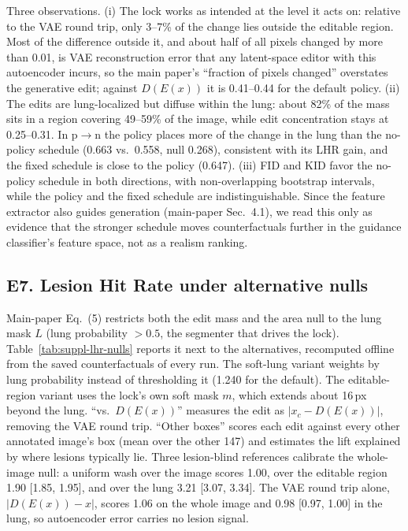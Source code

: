 Three observations. (i) The lock works as intended at the level it acts on: relative to the VAE round trip, only 3--7\% of the change lies outside the editable region. Most of the difference outside it, and about half of all pixels changed by more than 0.01, is VAE reconstruction error that any latent-space editor with this autoencoder incurs, so the main paper's ``fraction of pixels changed'' overstates the generative edit; against $D(E(x))$ it is 0.41--0.44 for the default policy. (ii) The edits are lung-localized but diffuse within the lung: about 82\% of the mass sits in a region covering 49--59\% of the image, while edit concentration stays at 0.25--0.31. In p$\to$n the policy places more of the change in the lung than the no-policy schedule (0.663 vs.\ 0.558, null 0.268), consistent with its LHR gain, and the fixed schedule is close to the policy (0.647). (iii) FID and KID favor the no-policy schedule in both directions, with non-overlapping bootstrap intervals, while the policy and the fixed schedule are indistinguishable. Since the feature extractor also guides generation (main-paper Sec.~4.1), we read this only as evidence that the stronger schedule moves counterfactuals further in the guidance classifier's feature space, not as a realism ranking.


\subsection*{E7. Lesion Hit Rate under alternative nulls}
\label{sec:suppl-lhr-nulls}

Main-paper Eq.~(5) restricts both the edit mass and the area null to the lung mask $L$ (lung probability $> 0.5$, the segmenter that drives the lock). Table~\ref{tab:suppl-lhr-nulls} reports it next to the alternatives, recomputed offline from the saved counterfactuals of every run. The soft-lung variant weights by lung probability instead of thresholding it (1.240 for the default). The editable-region variant uses the lock's own soft mask $m$, which extends about 16\,px beyond the lung. ``vs.\ $D(E(x))$'' measures the edit as $|x_c - D(E(x))|$, removing the VAE round trip. ``Other boxes'' scores each edit against every other annotated image's box (mean over the other 147) and estimates the lift explained by where lesions typically lie. Three lesion-blind references calibrate the whole-image null: a uniform wash over the image scores 1.00, over the editable region 1.90 [1.85, 1.95], and over the lung 3.21 [3.07, 3.34]. The VAE round trip alone, $|D(E(x)) - x|$, scores 1.06 on the whole image and 0.98 [0.97, 1.00] in the lung, so autoencoder error carries no lesion signal.

